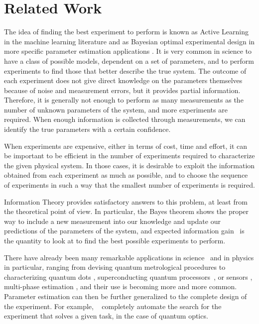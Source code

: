 \documentclass[10pt]{iopart}  %
\begin{document}
\section{Related Work}

The idea of finding the best experiment to perform is known as Active Learning in  the machine learning literature  \cite{cohn_improving_1994,settles_active_2012,tong_simon_active_2001} and as Bayesian optimal experimental design \cite{chaloner_bayesian_1995} in more specific parameter estimation applications \cite{fredlund_bayesian_2010, ryan_review_2016}.
It is very common in science to have a class of possible models, dependent on a set of parameters, and to perform experiments to find those that better describe the true system.
The outcome of each experiment does not give direct knowledge on the parameters themselves because of noise and measurement errors, but it provides partial information.
Therefore, it is generally not enough to perform as many measurements as the number of unknown parameters of the system, and more experiments are required.
When enough information is collected through measurements, we can identify the true parameters with a certain confidence.

When experiments are expensive, either in terms of cost, time and effort, it can be important to be efficient in the number of experiments required to characterize the given physical system.
In those cases, it is desirable to exploit the information obtained from each experiment as much as possible, and to choose the sequence of experiments in such a way that the smallest number of experiments is required.

Information Theory provides satisfactory answers to this problem, at least from the theoretical point of view.
In particular, the Bayes theorem shows the proper way to include a new measurement into our knowledge and update our predictions of the parameters of the system, and expected information gain~\cite{lindley_measure_1956} is the quantity to look at to find the best possible experiments to perform.

There have already been many remarkable applications in science~\cite{gal_deep_2017, sanchezlengeling_bayesian_2019} and in physics in particular, ranging from devising quantum metrological procedures \cite{hentschel_efficient_2011} to characterizing quantum dots \cite{lennon_efficiently_2019, nguyen_deep_2021}, superconducting quantum processors~\cite{hangleiter_precise_2021}, or sensors \cite{fiderer_neural-network_2021}, multi-phase estimation \cite{valeri_experimental_2020,cimini_deep_2023}, and their use is becoming more and more common.
Parameter estimation can then be further generalized to the complete design of the experiment. For example, ~\cite{krenn_automated_2016, melnikov_active_2018,krenn_computer-inspired_2020} completely automate the search for the experiment that solves a given task, in the case of quantum optics.
\end{document}
